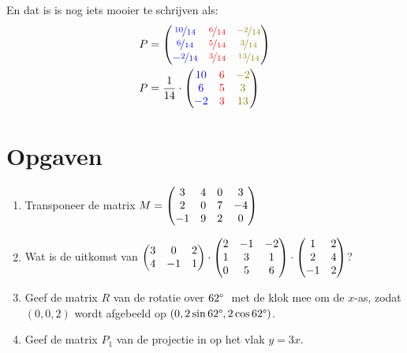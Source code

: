 En dat is is nog iets mooier te schrijven als:
\begin{align*}
P &= \matdrie{ \blu{\nicefrac{10}{14}} & \red{\nicefrac{6}{14}} & \gre{\nicefrac{-2}{14}}}
             { \blu{\nicefrac{6}{14}}  & \red{\nicefrac{5}{14}} & \gre{\nicefrac{3}{14}}}
             { \blu{-\nicefrac{2}{14}} & \red{\nicefrac{3}{14}} & \gre{\nicefrac{13}{14}}}  \\             
P &= \frac{1}{14}\cdot \matdrie{ \blu{10} & \red{6} & \gre{-2}}
                               { \blu{6}  & \red{5} & \gre{3} }
                               { \blu{-2} & \red{3} & \gre{13}}
\end{align*}

\newpage
\section{Opgaven}
\begin{enumerate}
    \setlength{\itemsep}{10pt}
	\item Transponeer de matrix $M = \begin{pmatrix} 3&4&0&3 \\ 2&0&7&-4 \\ -1&9&2&0 \end{pmatrix}$
	
	\item Wat is de uitkomst van $\begin{pmatrix} 3&0&2 \\ 4&-1&1 \end{pmatrix} \cdot \begin{pmatrix} 2&-1&-2 \\ 1&3&1 \\ 0&5&6 \end{pmatrix} \cdot \begin{pmatrix} 1&2 \\ 2&4 \\ -1&2 \end{pmatrix}$?
	
	\item Geef de matrix $R$ van de rotatie over $62\degree\ $ met de klok mee om de $x$-as, zodat $(0,0,2)$ wordt afgebeeld op $(0, 2\sin 62\degree , 2\cos 62\degree )$.
	
	\item Geef de matrix $P_1$ van de projectie in \RD op het vlak $y=3x$.
\end{enumerate}

